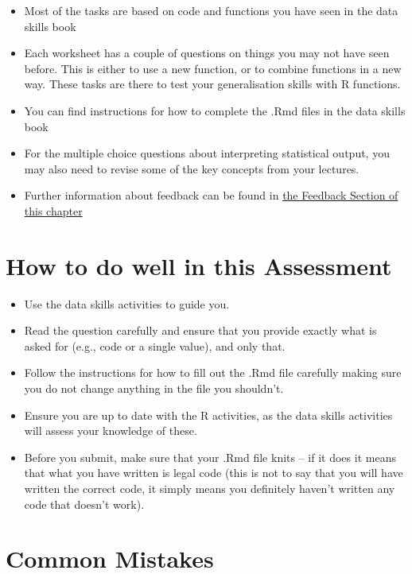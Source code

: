 \documentclass[
  english,
  letterpaper,
  DIV=11,
  numbers=noendperiod]{scrreprt}
\begin{document}
\begin{itemize}
\item
  Most of the tasks are based on code and functions you have seen in the
  data skills book
\item
  Each worksheet has a couple of questions on things you may not have
  seen before. This is either to use a new function, or to combine
  functions in a new way. These tasks are there to test your
  generalisation skills with R functions.
\item
  You can find instructions for how to complete the .Rmd files in the
  data skills book
\item
  For the multiple choice questions about interpreting statistical
  output, you may also need to revise some of the key concepts from your
  lectures.
\item
  Further information about feedback can be found in
  \hyperref[data_skills_feedback]{the Feedback Section of this chapter}
\end{itemize}

\section{How to do well in this
Assessment}\label{how-to-do-well-in-this-assessment}

\begin{itemize}
\item
  Use the data skills activities to guide you.
\item
  Read the question carefully and ensure that you provide exactly what
  is asked for (e.g., code or a single value), and only that.
\item
  Follow the instructions for how to fill out the .Rmd file carefully
  making sure you do not change anything in the file you shouldn't.
\item
  Ensure you are up to date with the R activities, as the data skills
  activities will assess your knowledge of these.
\item
  Before you submit, make sure that your .Rmd file knits -- if it does
  it means that what you have written is legal code (this is not to say
  that you will have written the correct code, it simply means you
  definitely haven't written any code that doesn't work).
\end{itemize}

\section{Common Mistakes}\label{common-mistakes}
\end{document}
